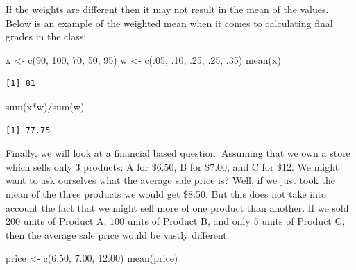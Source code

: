 \documentclass[
  letterpaper,
  DIV=11,
  numbers=noendperiod]{scrreprt}
\newenvironment{Shaded}{\begin{snugshade}}{\end{snugshade}}
\newcommand{\DecValTok}[1]{\textcolor[rgb]{0.68,0.00,0.00}{#1}}
\newcommand{\FloatTok}[1]{\textcolor[rgb]{0.68,0.00,0.00}{#1}}
\newcommand{\FunctionTok}[1]{\textcolor[rgb]{0.28,0.35,0.67}{#1}}
\newcommand{\NormalTok}[1]{\textcolor[rgb]{0.00,0.23,0.31}{#1}}
\newcommand{\OtherTok}[1]{\textcolor[rgb]{0.00,0.23,0.31}{#1}}
\newcommand{\SpecialCharTok}[1]{\textcolor[rgb]{0.37,0.37,0.37}{#1}}
\begin{document}
If the weights are different then it may not result in the mean of the
values. Below is an example of the weighted mean when it comes to
calculating final grades in the class:

\begin{Shaded}
\begin{Highlighting}[]
\NormalTok{x }\OtherTok{\textless{}{-}} \FunctionTok{c}\NormalTok{(}\DecValTok{90}\NormalTok{, }\DecValTok{100}\NormalTok{, }\DecValTok{70}\NormalTok{, }\DecValTok{50}\NormalTok{, }\DecValTok{95}\NormalTok{)}
\NormalTok{w }\OtherTok{\textless{}{-}} \FunctionTok{c}\NormalTok{(.}\DecValTok{05}\NormalTok{, .}\DecValTok{10}\NormalTok{, .}\DecValTok{25}\NormalTok{, .}\DecValTok{25}\NormalTok{, .}\DecValTok{35}\NormalTok{)}
\FunctionTok{mean}\NormalTok{(x)}
\end{Highlighting}
\end{Shaded}

\begin{verbatim}
[1] 81
\end{verbatim}

\begin{Shaded}
\begin{Highlighting}[]
\FunctionTok{sum}\NormalTok{(x}\SpecialCharTok{*}\NormalTok{w)}\SpecialCharTok{/}\FunctionTok{sum}\NormalTok{(w)}
\end{Highlighting}
\end{Shaded}

\begin{verbatim}
[1] 77.75
\end{verbatim}

Finally, we will look at a financial based question. Assuming that we
own a store which sells only 3 products: A for \$6.50, B for \$7.00, and
C for \$12. We might want to ask ourselves what the average sale price
is? Well, if we just took the mean of the three products we would get
\$8.50. But this does not take into account the fact that we might sell
more of one product than another. If we sold 200 units of Product A, 100
units of Product B, and only 5 units of Product C, then the average sale
price would be vastly different.

\begin{Shaded}
\begin{Highlighting}[]
\NormalTok{price }\OtherTok{\textless{}{-}} \FunctionTok{c}\NormalTok{(}\FloatTok{6.50}\NormalTok{, }\FloatTok{7.00}\NormalTok{, }\FloatTok{12.00}\NormalTok{)}
\FunctionTok{mean}\NormalTok{(price)}
\end{Highlighting}
\end{Shaded}
\end{document}
